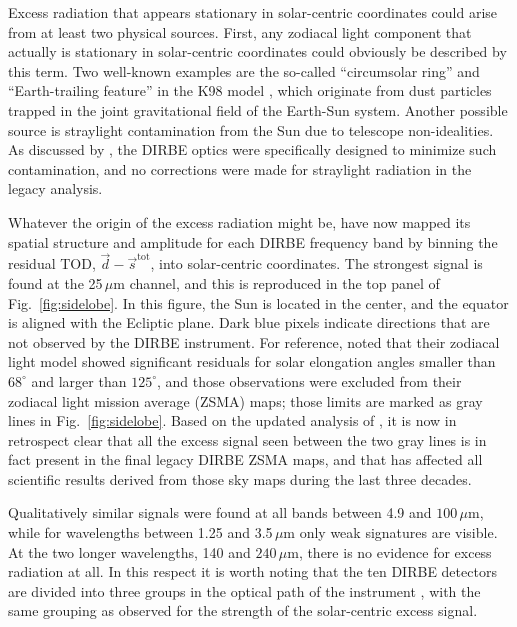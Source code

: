 \documentclass{aa}
\newcommand{\dv}[0]{\vec{d}}
\newcommand{\s}[0]{\vec{s}}
\begin{document}
Excess radiation that appears stationary in solar-centric coordinates
could arise from at least two physical sources. First, any zodiacal
light component that actually is stationary in solar-centric
coordinates could obviously be described by this term. Two well-known
examples are the so-called ``circumsolar ring'' and ``Earth-trailing
feature'' in the K98 model \citep{kelsall1998}, which originate from
dust particles trapped in the joint gravitational field of the
Earth-Sun system. Another possible source is straylight contamination
from the Sun due to telescope non-idealities. As discussed by
\citet{hauser1998}, the DIRBE optics were specifically designed to
minimize such contamination, and no corrections were made for
straylight radiation in the legacy analysis. 

Whatever the origin of the excess radiation might be, \citet{CG02_01}
have now mapped its spatial structure and amplitude for each DIRBE
frequency band by binning the residual TOD, $\dv - \s^{\mathrm{tot}}$,
into solar-centric coordinates. The strongest signal is found at the
25\,$\mu\mathrm{m}$ channel, and this is reproduced in the top panel
of Fig.~\ref{fig:sidelobe}. In this figure, the Sun is located in the
center, and the equator is aligned with the Ecliptic plane. Dark blue
pixels indicate directions that are not observed by the DIRBE
instrument. For reference, \citet{kelsall1998} noted that their
zodiacal light model showed significant residuals for solar elongation
angles smaller than $68^{\circ}$ and larger than $125^{\circ}$, and
those observations were excluded from their zodiacal light mission
average (ZSMA) maps; those limits are marked as gray lines in
Fig.~\ref{fig:sidelobe}. Based on the updated analysis of
\citet{CG02_01}, it is now in retrospect clear that all the excess
signal seen between the two gray lines is in fact present in the final
legacy DIRBE ZSMA maps, and that has affected all scientific results
derived from those sky maps during the last three decades.

Qualitatively similar signals were found at all bands between 4.9 and
$100\,\mu\mathrm{m}$, while for wavelengths between 1.25 and
3.5$\,\mu\mathrm{m}$ only weak signatures are visible. At the two
longer wavelengths, 140 and $240\,\mu\mathrm{m}$, there is no evidence
for excess radiation at all. In this respect it is worth noting that
the ten DIRBE detectors are divided into three groups in the optical
path of the instrument \citep{silverberg93}, with the same
grouping as observed for the strength of the solar-centric excess
signal.
\end{document}

